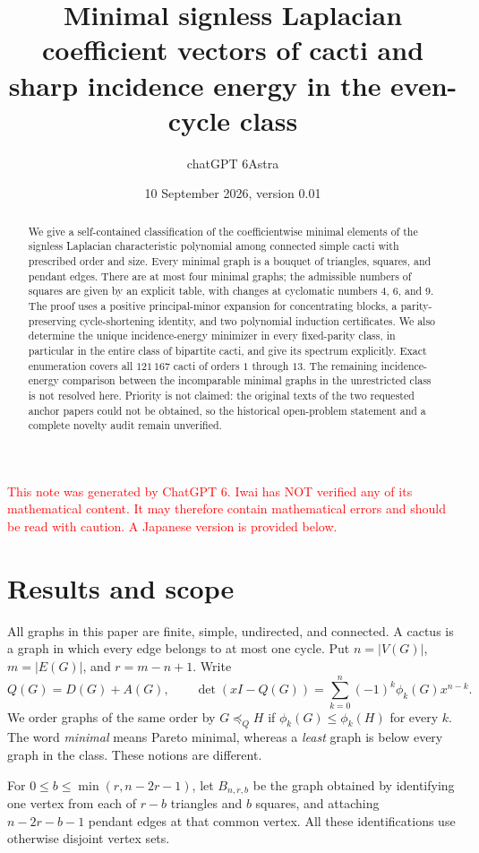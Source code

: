 \documentclass[12pt]{amsart}
\title[Minimal signless Laplacian coefficients of cacti]
{Minimal signless Laplacian coefficient vectors of cacti and sharp incidence
energy in the even-cycle class}
\author{chatGPT 6Astra}
\date{10 September 2026, version 0.01}
\theoremstyle{definition}
\theoremstyle{remark}
\numberwithin{equation}{section}
\newcommand{\xr}[1]{\textcolor{red}{#1}}
\begin{document}
\raggedbottom
\begin{abstract}
We give a self-contained classification of the coefficientwise minimal elements
of the signless Laplacian characteristic polynomial among connected simple
cacti with prescribed order and size. Every minimal graph is a bouquet of
triangles, squares, and pendant edges. There are at most four minimal graphs;
the admissible numbers of squares are given by an explicit table, with changes
at cyclomatic numbers $4$, $6$, and $9$. The proof uses a positive
principal-minor expansion for concentrating blocks, a parity-preserving
cycle-shortening identity, and two polynomial induction certificates.
We also determine the unique incidence-energy minimizer in every fixed-parity
class, in particular in the entire class of bipartite cacti, and give its
spectrum explicitly. Exact enumeration covers all $121\,167$ cacti of orders
$1$ through $13$. The remaining incidence-energy comparison between the
incomparable minimal graphs in the unrestricted class is not resolved here.
Priority is not claimed: the original texts of the two requested anchor papers
could not be obtained, so the historical open-problem statement and a complete
novelty audit remain unverified.
\end{abstract}
\maketitle
\tableofcontents

\xr{This note was generated by ChatGPT 6. Iwai has NOT verified any of its mathematical content. It may therefore contain mathematical errors and should be read with caution. A Japanese version is provided below.}


\section{Results and scope}
All graphs in this paper are finite, simple, undirected, and connected.
A cactus is a graph in which every edge belongs to at most one cycle.
Put $n=|V(G)|$, $m=|E(G)|$, and $r=m-n+1$. Write
\[
 Q(G)=D(G)+A(G),\qquad
 \det(xI-Q(G))=\sum_{k=0}^n(-1)^k\phi_k(G)x^{n-k}.
\]
We order graphs of the same order by $G\preceq_Q H$ if
$\phi_k(G)\leq\phi_k(H)$ for every $k$. The word \emph{minimal} means
Pareto minimal, whereas a \emph{least} graph is below every graph in the class.
These notions are different.

For $0\le b\le\min(r,n-2r-1)$, let $B_{n,r,b}$ be the graph obtained by
identifying one vertex from each of $r-b$ triangles and $b$ squares, and
attaching $n-2r-b-1$ pendant edges at that common vertex. All these
identifications use otherwise disjoint vertex sets.
\end{document}
